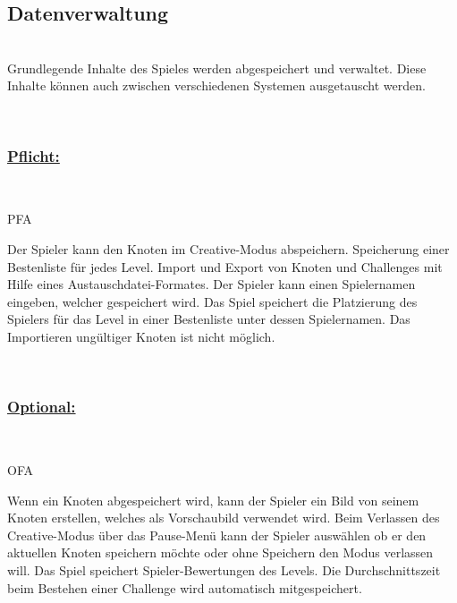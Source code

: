%
%


\subsection{Datenverwaltung}

%
%
\renewcommand{\K}{}
%
%

~\\
Grundlegende Inhalte des Spieles werden abgespeichert und verwaltet.
Diese Inhalte können auch zwischen verschiedenen Systemen ausgetauscht werden.

~\\

%
%
\subsubsection*{\underline{Pflicht:}}~\\

\begin{ids}{\gls{PFA\K}}

	\id[ 390] Der Spieler kann den Knoten im Creative-Modus abspeichern.
	\id[ 400]Speicherung einer Bestenliste für jedes Level.
	\id[ 410] Import und Export von Knoten und Challenges mit Hilfe eines Austauschdatei-Formates.
	\id[ 420] Der Spieler kann einen Spielernamen eingeben, welcher gespeichert wird.
	\id[ 430] Das Spiel speichert die Platzierung des Spielers  für das Level in einer Bestenliste unter dessen Spielernamen.
	\id[ 440] Das Importieren ungültiger Knoten ist nicht möglich.
	
 	
 	
	
\end{ids}

~\\


%
%
\subsubsection*{\underline{Optional:}}~\\


\begin{ids}{\gls{OFA\K}}

	\id[ 450] Wenn ein Knoten abgespeichert wird, kann der Spieler ein Bild von seinem Knoten erstellen, welches als Vorschaubild verwendet wird.
	\id[ 460] Beim Verlassen des Creative-Modus über das Pause-Menü  kann der Spieler auswählen ob er den aktuellen Knoten speichern möchte oder ohne Speichern den Modus verlassen will.
	\id[ 470] Das Spiel speichert Spieler-Bewertungen des Levels.
	\id[ 480] Die Durchschnittszeit beim Bestehen einer Challenge wird automatisch mitgespeichert.
	
 	
 	
	
\end{ids}

~\\